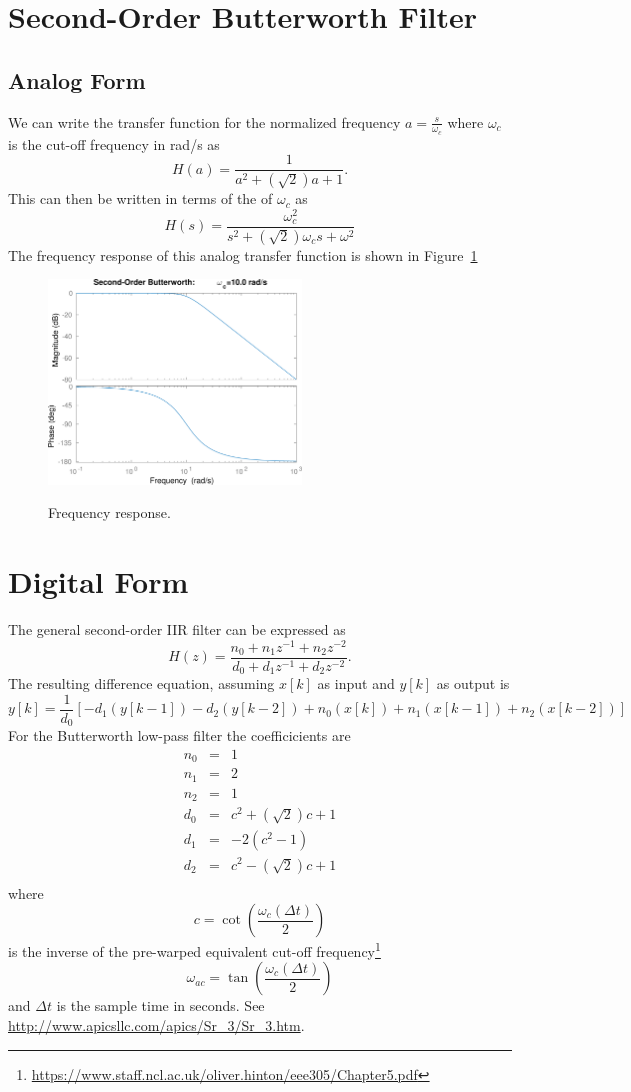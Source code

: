 \documentclass[12pt, letterpaper, twoside]{article}
\begin{document}
\section{Second-Order Butterworth Filter}
\subsection{Analog Form}
We can write the transfer function for the normalized frequency $a=\frac{s}{\omega_c}$ where $\omega_c$ is the cut-off frequency in rad/s as
\[
H(a) = \frac{1}{a^2 + (\sqrt{2}) a + 1}.
\]
This can then be written in terms of the of $\omega_c$ as
\[
H(s) = \frac{\omega_c^2}{s^2 + (\sqrt{2})\omega_c s + \omega^2}
\]
The frequency response of this analog transfer function is shown in Figure~\ref{f:butter}
\begin{figure}[ht!]
\centering
{\includegraphics[width=0.6\textwidth]{butter_2.png}}
\caption{Frequency response.}
\label{f:butter}
\end{figure}

\section{Digital Form}
The general second-order IIR filter can be expressed as
\[ 
H(z) = \frac{n_0+n_1 z^{-1} + n_2 z^{-2}}{d_0 +d_1 z^{-1}+d_2 z^{-2}}.
\]
The resulting difference equation, assuming $x[k]$ as input and $y[k]$ as output is
\[
y[k] = \frac{1}{d_0}\left[ -d_1 (y[k-1]) -d_2(y[k-2]) + n_0(x[k]) + n_1(x[k-1]) + n_2 (x[k-2])\right]
\]
For the Butterworth low-pass filter the coefficicients are
\begin{eqnarray*}
n_0 & = & 1 \\
n_1 & = & 2 \\
n_2 & = & 1 \\
d_0 & = & c^2+(\sqrt{2})c+1 \\ 
d_1 & = & -2(c^2-1) \\ 
d_2 & = & c^2-(\sqrt{2})c+1 \\ 
\end{eqnarray*}
where
\[
c = \cot{\left(\frac{\omega_c (\Delta t)}{2}\right)}
\]
is the inverse of the pre-warped equivalent cut-off frequency\footnote{\url{https://www.staff.ncl.ac.uk/oliver.hinton/eee305/Chapter5.pdf}}
\[
\omega_{ac} = \tan{\left(\frac{\omega_c (\Delta t)}{2}\right)}
\]
and $\Delta t$ is the sample time in seconds.  See \url{http://www.apicsllc.com/apics/Sr_3/Sr_3.htm}.
\end{document}
